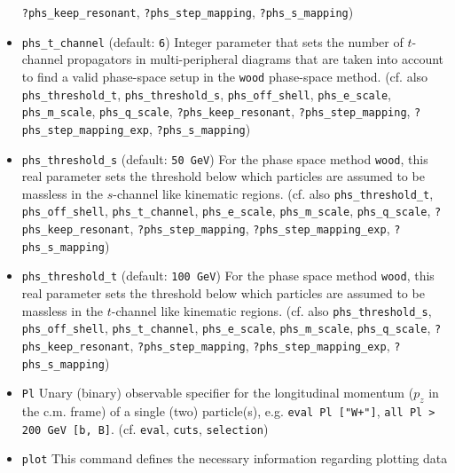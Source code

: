 \documentclass[12pt]{book}
\newcommand{\ttt}[1]{\texttt{#1}}
\begin{document}
\begin{itemize}
\ttt{?phs\_keep\_resonant}, \ttt{?phs\_step\_mapping},
\ttt{?phs\_s\_mapping})  
\item
\ttt{phs\_t\_channel} \qquad (default: \ttt{6}) \newline
Integer parameter that sets the number of $t$-channel propagators in
multi-peripheral diagrams that are taken into account to  
find a valid phase-space setup in the \ttt{wood} phase-space method. 
(cf. also \ttt{phs\_threshold\_t},
\ttt{phs\_threshold\_s}, \ttt{phs\_off\_shell}, \ttt{phs\_e\_scale}, 
\ttt{phs\_m\_scale}, \ttt{phs\_q\_scale},
\ttt{?phs\_keep\_resonant}, \ttt{?phs\_step\_mapping},
\newline \ttt{?phs\_step\_mapping\_exp}, 
\ttt{?phs\_s\_mapping}) 
\item
\ttt{phs\_threshold\_s} \qquad (default: \ttt{50 GeV}) \newline
For the phase space method \ttt{wood}, this real parameter sets the
threshold below which particles are assumed to be massless in the
$s$-channel like kinematic regions. (cf. also \ttt{phs\_threshold\_t},
\ttt{phs\_off\_shell}, \ttt{phs\_t\_channel}, \ttt{phs\_e\_scale}, 
\ttt{phs\_m\_scale}, \newline \ttt{phs\_q\_scale},
\ttt{?phs\_keep\_resonant}, \ttt{?phs\_step\_mapping},
\ttt{?phs\_step\_mapping\_exp}, \newline \ttt{?phs\_s\_mapping})
\item
\ttt{phs\_threshold\_t} \qquad (default: \ttt{100 GeV}) \newline
For the phase space method \ttt{wood}, this real parameter sets the
threshold below which particles are assumed to be massless in the
$t$-channel like kinematic regions. (cf. also \ttt{phs\_threshold\_s},
\ttt{phs\_off\_shell}, \ttt{phs\_t\_channel}, \ttt{phs\_e\_scale}, 
\ttt{phs\_m\_scale}, \newline \ttt{phs\_q\_scale},
\ttt{?phs\_keep\_resonant}, \ttt{?phs\_step\_mapping},
\ttt{?phs\_step\_mapping\_exp}, \newline \ttt{?phs\_s\_mapping})
\item
\ttt{Pl} \newline
Unary (binary) observable specifier for the longitudinal momentum
($p_z$ in the c.m. frame) of a single (two) particle(s),
e.g. \ttt{eval Pl ["W+"]}, \ttt{all Pl > 200 GeV [b,
B]}. (cf. \ttt{eval}, \ttt{cuts}, \ttt{selection})
\item
\ttt{plot} \newline
This command defines the necessary information regarding plotting data

\end{itemize}
\end{document}

